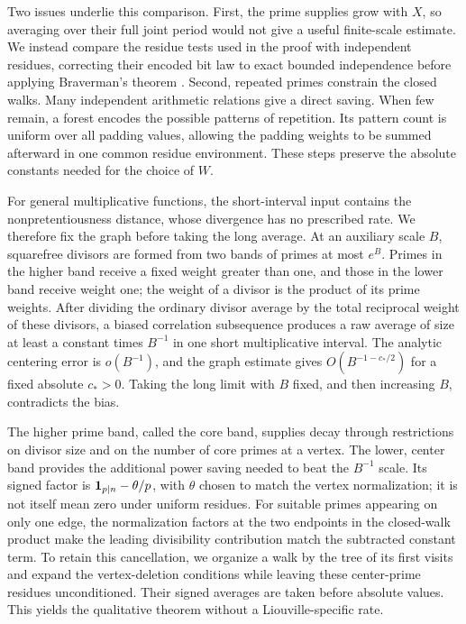 Two issues underlie this comparison. First, the prime supplies grow
with $X$, so averaging over their full joint period would not give
a useful finite-scale estimate. We instead compare the residue tests
used in the proof with independent residues, correcting their encoded
bit law to exact bounded independence before applying Braverman's
theorem \cite{Braverman10}. Second, repeated primes constrain the
closed walks. Many independent arithmetic relations give a direct
saving. When few remain, a forest encodes the possible patterns of
repetition. Its pattern count is uniform over all padding values,
allowing the padding weights to be summed afterward in one common
residue environment. These steps preserve the absolute constants
needed for the choice of $W$.

For general multiplicative functions, the short-interval input
contains the nonpretentiousness distance, whose divergence has no
prescribed rate. We therefore fix the graph before taking the long
average. At an auxiliary scale $B$, squarefree divisors are formed from
two bands of primes at most $e^B$. Primes in the higher band receive a
fixed weight greater than one, and those in the lower band receive
weight one; the weight of a divisor is the product of its prime weights.
After dividing the ordinary divisor average by the total reciprocal
weight of these divisors, a biased correlation subsequence produces a
raw average of size at least a constant times $B^{-1}$ in one short
multiplicative interval. The analytic centering error is $o(B^{-1})$,
and the graph estimate gives $O(B^{-1-c_* /2})$ for a fixed absolute
$c_*>0$. Taking the long limit with $B$ fixed, and then increasing $B$,
contradicts the bias.

The higher prime band, called the core band, supplies decay through
restrictions on divisor size and on the number of core primes at a
vertex. The lower, center band provides the additional power saving
needed to beat the $B^{-1}$ scale. Its signed factor is
$\mathbf 1_{p\mid n}-\theta/p$, with
$\theta$ chosen to match the vertex normalization; it is not itself
mean zero under uniform residues. For suitable primes appearing on
only one edge, the normalization factors at the two endpoints in the
closed-walk product make the leading divisibility contribution match
the subtracted constant term.
To retain this cancellation,
we organize a walk by the tree of its first visits and expand the
vertex-deletion conditions while leaving these center-prime residues
unconditioned. Their signed averages are taken before absolute values.
This yields the qualitative theorem without a Liouville-specific rate.

